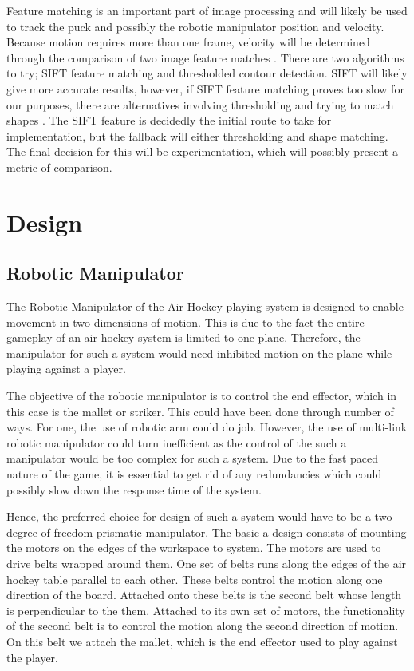 \documentclass[letterpaper, 12 pt, conference]{ieeeconf}
\begin{document}
Feature matching is an important part of image processing and will likely be used to track the puck and possibly the robotic manipulator position and velocity. Because motion requires more than one frame, velocity will be determined through the comparison of two image feature matches \cite{rahman}. There are two algorithms to try; SIFT feature matching and thresholded contour detection. SIFT will likely give more accurate results, however, if SIFT feature matching proves too slow for our purposes, there are alternatives involving thresholding and trying to match shapes \cite{wang} \cite{marra} \cite{bishop}. The SIFT feature is decidedly the initial route to take for implementation, but the fallback will either thresholding and shape matching.  The final decision for this will be experimentation, which will possibly present a metric of comparison.


\section{Design}
\label{design}
\subsection{Robotic Manipulator}
\label{design-roboticmanipulator}
The Robotic Manipulator of the Air Hockey playing system is designed to enable movement in two dimensions of motion. This is due to the fact the entire gameplay of an air hockey system is limited to one plane. Therefore, the manipulator for such a system would need inhibited motion on the plane while playing against a player.

The objective of the robotic manipulator is to control the end effector, which in this case is the mallet or striker. This could have been done through number of ways. For one, the use of robotic arm could do job. However, the use of multi-link robotic manipulator could turn inefficient as the control of the such a manipulator would be too complex for such a system. Due to the fast paced nature of the game, it is essential to get rid of any redundancies which could possibly slow down the response time of the system.

Hence, the preferred choice for design of such a system would have to be a two degree of freedom prismatic manipulator. The basic a design consists of mounting the motors on the edges of the workspace to system. The motors are used to drive belts wrapped around them. One set of belts runs along the edges of the air hockey table parallel to each other. These belts control the motion along one direction of the board. Attached onto these belts is the second belt whose length is perpendicular to the them. Attached to its own set of motors, the functionality of the second belt is to control the motion along the second direction of motion. On this belt we attach the mallet, which is the end effector used to play against the player.
\end{document}
